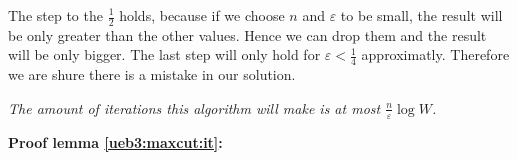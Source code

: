 The step to the $\frac{1}{2}$ holds, because if we choose $n$ and $\varepsilon$ to be small, the result will be only greater than the other values. Hence we can drop them and the result will be only bigger. The last step will only hold for $\varepsilon < \frac{1}{4}$ approximatly. Therefore we are shure there is a mistake in our solution.\\

\begin{lemma}\label{ueb3:maxcut:it}
{\rmfamily\itshape
The amount of iterations this algorithm will make is at most $\frac{n}{\varepsilon} \log W$.
}
\end{lemma}
\textbf{Proof lemma \ref{ueb3:maxcut:it}:}\\



